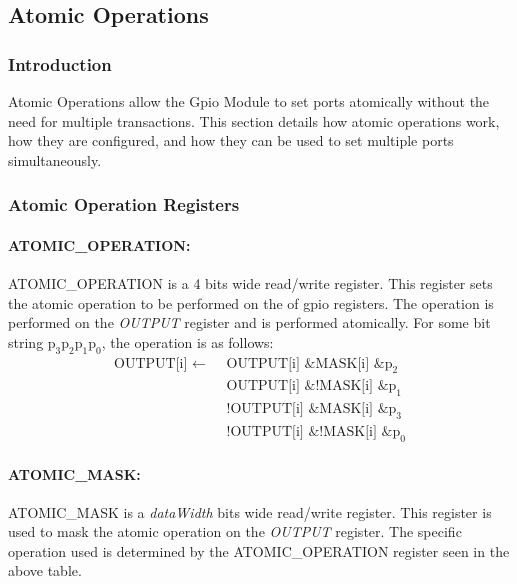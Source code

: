 \subsection{Atomic Operations}

\subsubsection{Introduction}
Atomic Operations allow the Gpio Module to set ports atomically without the need for multiple transactions. This section details how atomic operations work, how they are configured, and how they can be used to set multiple ports simultaneously.

\subsubsection{Atomic Operation Registers}

\paragraph{ATOMIC\_OPERATION:}
ATOMIC\_OPERATION is a 4 bits wide read/write register. This register sets the atomic operation to be performed on the
of gpio registers. The operation is performed on the \textit{OUTPUT} register and is performed atomically.\newline\newline
For some bit string $\text{p}_3\text{p}_2\text{p}_1\text{p}_0$, the operation is as follows:
\begin{equation*}
  \begin{split}
    \text{OUTPUT[i] }\leftarrow\text{ }&\text{OUTPUT[i]} \text{ \& } \text{MASK[i]} \text{ \& } \text{p}_2\\
                        &\text{OUTPUT[i]} \text{ \& } \text{!MASK[i]} \text{ \& } \text{p}_1\\
                        &\text{!OUTPUT[i]} \text{ \& } \text{MASK[i]} \text{ \& } \text{p}_3\\
                        &\text{!OUTPUT[i]} \text{ \& } \text{!MASK[i]} \text{ \& } \text{p}_0
  \end{split}
\end{equation*}


\paragraph{ATOMIC\_MASK:}
ATOMIC\_MASK is a \textit{dataWidth} bits wide read/write register. This register is used to mask the atomic operation on the \textit{OUTPUT} register. 
The specific operation used is determined by the ATOMIC\_OPERATION register seen in the above table.

